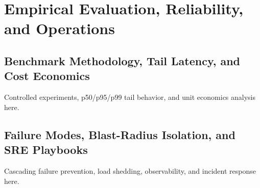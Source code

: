 \documentclass[11pt,oneside]{book}
\begin{document}
\part{Empirical Evaluation, Reliability, and Operations}

\chapter{Benchmark Methodology, Tail Latency, and Cost Economics}
\label{ch:benchmarks}
Controlled experiments, p50/p95/p99 tail behavior, and unit economics analysis here.

\chapter{Failure Modes, Blast-Radius Isolation, and SRE Playbooks}
\label{ch:sre}
Cascading failure prevention, load shedding, observability, and incident response here.

\backmatter




\end{document}
